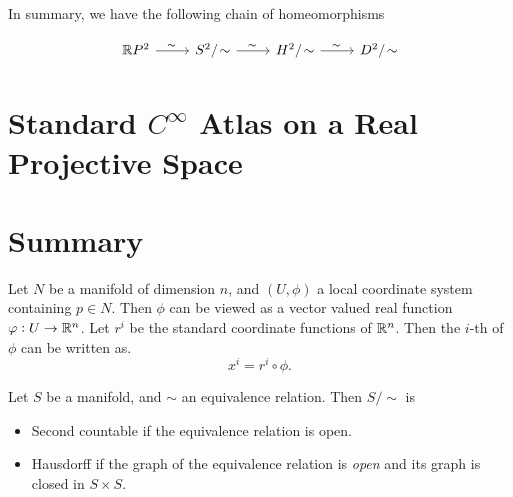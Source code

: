 In summary, we have the following chain of homeomorphisms

\[\begin{tikzcd}
	{\R P^2} & {S^2/\sim} & {H^2/\sim} & {D^2/\sim}
	\arrow["\sim", from=1-1, to=1-2]
	\arrow["\sim", from=1-2, to=1-3]
	\arrow["\sim", from=1-3, to=1-4]
\end{tikzcd}\]



\section{Standard $ C^\infty $ Atlas on a Real Projective Space}



\section{Summary}


\begin{summary}
	Let $ N $ be a manifold of dimension $ n $, and $ (U,\phi) $ a local coordinate system containing $ p \in N $. Then $ \phi $ can be viewed as a vector valued real function $ \varphi:U \to \mathbb{R}^n $. Let $ r^i $ be the standard coordinate functions of $ \mathbb{R}^n $. Then the $ i\text{-th} $ of $ \phi $ can be written as.
	\[ x^i = r^i \circ \phi . \]
\end{summary}
\begin{summary}
	Let $ S $ be a manifold, and $ \sim $ an equivalence relation. Then $ S/\sim $ is 
	\begin{itemize}
		\item Second countable if the equivalence relation is open.
		\item Hausdorff if the graph of the equivalence relation is \emph{open} and its graph is closed in $ S\times S $.
	\end{itemize}
\end{summary}


